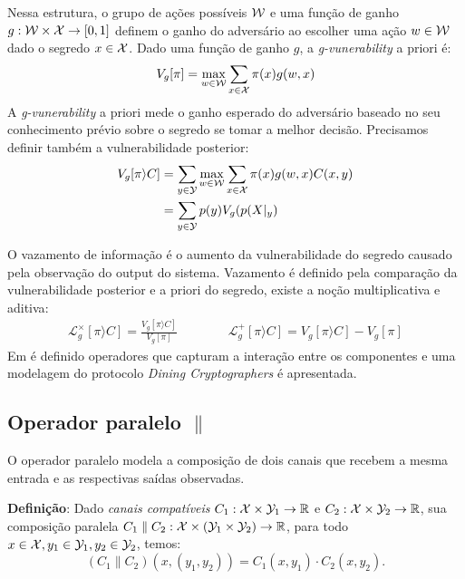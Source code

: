 Nessa estrutura, o grupo de ações possíveis $\mathcal{W}$ e uma função de ganho $g:\mathcal{W} \times \mathcal{X} \rightarrow [0,1]$ definem o ganho do adversário ao escolher uma ação $w\in\mathcal{W}$ dado o segredo $x\in\mathcal{X}$. Dado uma função de ganho $g$, a \emph{g-vunerability} a priori é:
$$ V_g[\pi] = \max_{w\in\mathcal{W}} \sum_{x\in\mathcal{X}} \pi(x)g(w,x) $$
A \emph{g-vunerability} a priori mede o ganho esperado do adversário baseado no seu conhecimento prévio sobre o segredo se tomar a melhor decisão. Precisamos definir também a vulnerabilidade posterior:
\begin{align*}
V_g[\pi\rangle C]  & = \sum_{y\in\mathcal{Y}} \max_{w\in\mathcal{W}} \sum_{x\in\mathcal{X}} \pi(x)g(w,x)C(x,y) \\
& = \sum_{y\in\mathcal{Y}} p(y) V_g(p(X|_y)
\end{align*}

O vazamento de informação é o aumento da vulnerabilidade do segredo causado pela observação do output do sistema. 
Vazamento é definido pela comparação da vulnerabilidade posterior e a priori do segredo, existe a noção multiplicativa e aditiva\cite{Alvim:14:CSF}:
\begin{align*}
\mathcal{L}^{\times}_{g}[\pi\rangle C] = \frac{V_g[\pi\rangle C]}{V_g[\pi]}&\hspace{1cm}&\mathcal{L}^{+}_{g}[\pi\rangle C] = {V_g[\pi\rangle C]} - {V_g[\pi]}
\end{align*}
Em\cite{Americo} é definido operadores que capturam a interação entre os componentes e uma modelagem do protocolo \emph{Dining Cryptographers} é apresentada.
\subsection*{Operador paralelo $\parallel$}  
O operador paralelo modela a composição de dois canais que recebem a mesma entrada e as respectivas saídas observadas. 

\textbf{Definição}: Dado \emph{canais compatíveis} $C_1:\mathcal{X}\times\mathcal{Y}_1 \rightarrow \mathbb{R}$ e $C_2:\mathcal{X}\times\mathcal{Y}_2 \rightarrow \mathbb{R}$, sua composição paralela $C_1 \parallel C_2 : \mathcal{X}\times(\mathcal{Y}_1\times\mathcal{Y}_2) \rightarrow \mathbb{R}$, para todo $x\in\mathcal{X}, y_1\in\mathcal{Y}_1, y_2\in\mathcal{Y}_2$, temos: $$(C_1 \parallel C_2)(x,(y_1,y_2)) = C_1(x,y_1) \cdot C_2(x,y_2).$$
